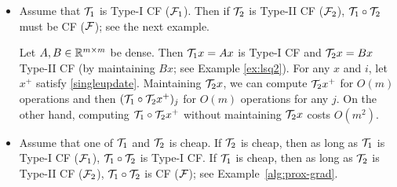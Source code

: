 \begin{itemize}
\item Assume that ${\mathcal{T}}_1$ is Type-I CF (${\mathcal{F}}_1$). Then if ${\mathcal{T}}_2$ is Type-II CF (${\mathcal{F}}_2$), ${\mathcal{T}}_1\circ{\mathcal{T}}_2$ must be CF (${\mathcal{F}}$); see the next example.
\begin{example}\label{den-den}
Let $A,B\in\mathbb{R}^{m\times m}$ be dense. Then ${\mathcal{T}}_1 x=Ax$ is Type-I CF and ${\mathcal{T}}_2 x=Bx$ Type-II CF (by maintaining $Bx$; see {Example \ref{ex:lsq2}}). For any $x$ and $i$, let $x^+$ satisfy \eqref{singleupdate}. Maintaining ${\mathcal{T}}_2 x$, we can compute ${\mathcal{T}}_2 x^+$ for $O(m)$ operations and then $({\mathcal{T}}_1\circ{\mathcal{T}}_2 x^+)_j$ for $O(m)$ operations for any $j$. On the other hand, computing ${\mathcal{T}}_1\circ{\mathcal{T}}_2 x^+$ without maintaining ${\mathcal{T}}_2 x$ costs $O(m^2)$. 
\end{example}


\item Assume that one of ${\mathcal{T}}_1$ and ${\mathcal{T}}_2$ is cheap. If ${\mathcal{T}}_2$ is cheap, then as long as ${\mathcal{T}}_1$ is Type-I CF (${\mathcal{F}}_1$), ${\mathcal{T}}_1\circ {\mathcal{T}}_2$ is Type-I CF. If ${\mathcal{T}}_1$ is cheap, then as long as ${\mathcal{T}}_2$ is Type-II CF (${\mathcal{F}}_2$), ${\mathcal{T}}_1\circ {\mathcal{T}}_2$ is CF (${\mathcal{F}}$); see Example~\ref{alg:prox-grad}.
\end{itemize}

